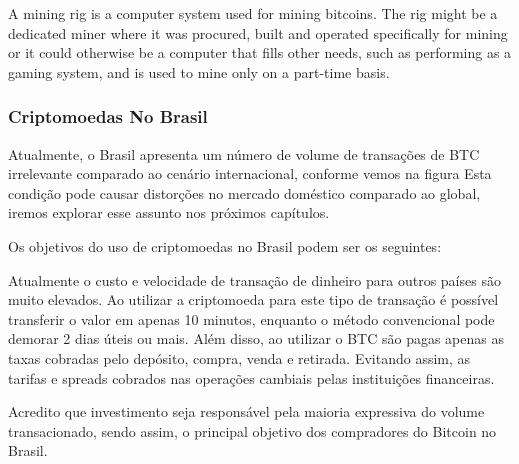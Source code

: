\documentclass[
	article,			%
	12pt,				%
	openright,			%
	oneside,			%
	a4paper,			%
	chapter=TITLE,		%
	section=TITLE,		%
	subsection=TITLE,	%
	subsubsection=TITLE,%
	subsubsubsection=TITLE, %
	english,			%
	brazil,				%
	]{abntex2}
\begin{document}
A mining rig is a computer system used for mining bitcoins. The rig might be a dedicated miner where it was procured, built and operated specifically for mining or it could otherwise be a computer that fills other needs, such as performing as a gaming system, and is used to mine only on a part-time basis.

\cite{BitcoinWiki2015}

\subsubsection{Criptomoedas No Brasil}

Atualmente, o Brasil apresenta um número de volume de transações de BTC
irrelevante comparado ao cenário internacional, conforme vemos na figura Esta condição pode causar distorções no mercado doméstico comparado ao global, iremos explorar esse assunto nos próximos capítulos.

Os objetivos do uso de criptomoedas no Brasil podem ser os seguintes:

Atualmente o custo e velocidade de transação de dinheiro para outros países são muito elevados. Ao utilizar a criptomoeda para este tipo de transação é possível transferir o valor em apenas 10 minutos, enquanto o método convencional pode demorar 2 dias úteis ou mais. Além disso, ao utilizar o BTC são pagas apenas as taxas cobradas pelo depósito, compra, venda e retirada. Evitando assim, as tarifas e spreads cobrados nas operações cambiais pelas instituições financeiras.

\cite{Prado2017}

Acredito que investimento seja responsável pela maioria expressiva do volume transacionado, sendo assim, o principal objetivo dos compradores do Bitcoin no Brasil.

\cite{Prado2017}


%

\cite{Weber2012}


%
\end{document}
